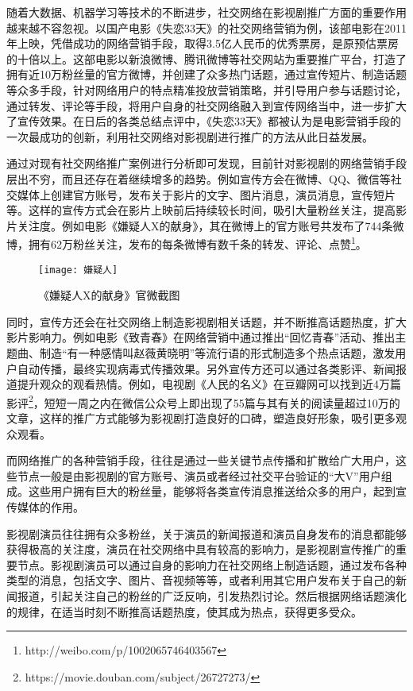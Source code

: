 随着大数据、机器学习等技术的不断进步，社交网络在影视剧推广方面的重要作用越来越不容忽视。以国产电影《失恋33天》的社交网络营销为例，该部电影在2011年上映，凭借成功的网络营销手段，取得3.5亿人民币的优秀票房，是原预估票房的十倍以上\cite{熊莉2012失恋}。这部电影以新浪微博、腾讯微博等社交网站为重要推广平台，打造了拥有近10万粉丝量的官方微博，并创建了众多热门话题，通过宣传短片、制造话题等众多手段，针对网络用户的特点精准投放营销策略，并引导用户参与话题讨论，通过转发、评论等手段，将用户自身的社交网络融入到宣传网络当中，进一步扩大了宣传效果。在日后的各类总结点评中，《失恋33天》都被认为是电影营销手段的一次最成功的创新，利用社交网络对影视剧进行推广的方法从此日益发展。

通过对现有社交网络推广案例进行分析即可发现，目前针对影视剧的网络营销手段层出不穷，而且还存在着继续增多的趋势。例如宣传方会在微博、QQ、微信等社交媒体上创建官方账号，发布关于影片的文字、图片消息，演员消息，宣传短片等。这样的宣传方式会在影片上映前后持续较长时间，吸引大量粉丝关注，提高影片关注度。例如电影《嫌疑人X的献身》，其在微博上的官方账号共发布了744条微博，拥有62万粉丝关注，发布的每条微博有数千条的转发、评论、点赞\footnote{http://weibo.com/p/1002065746403567}。

\begin{figure}[h] 
  \centering
  \texttt{[image: 嫌疑人]}
  \caption{《嫌疑人X的献身》官微截图}
\end{figure}

同时，宣传方还会在社交网络上制造影视剧相关话题，并不断推高话题热度，扩大影片影响力。例如电影《致青春》在网络营销中通过推出“回忆青春”活动、推出主题曲、制造“有一种感情叫赵薇黄晓明”等流行语的形式制造多个热点话题，激发用户自动传播，最终实现病毒式传播效果。另外宣传方还可以通过各类影评、新闻报道提升观众的观看热情。例如，电视剧《人民的名义》在豆瓣网可以找到近4万篇影评\footnote{https://movie.douban.com/subject/26727273/}，短短一周之内在微信公众号上即出现了55篇与其有关的阅读量超过10万的文章，这样的推广方式能够为影视剧打造良好的口碑，塑造良好形象，吸引更多观众观看。

而网络推广的各种营销手段，往往是通过一些关键节点传播和扩散给广大用户，这些节点一般是由影视剧的官方账号、演员或者经过社交平台验证的“大V”用户组成。这些用户拥有巨大的粉丝量，能够将各类宣传消息推送给众多的用户，起到宣传媒体的作用\cite{kwak2010twitter}。

影视剧演员往往拥有众多粉丝，关于演员的新闻报道和演员自身发布的消息都能够获得极高的关注度，演员在社交网络中具有较高的影响力\cite{shafiq2013identifying}，是影视剧宣传推广的重要节点。影视剧演员可以通过自身的影响力在社交网络上制造话题，通过发布各种类型的消息，包括文字、图片、音视频等等，或者利用其它用户发布关于自己的新闻报道，引起关注自己的粉丝的广泛反响，引发热烈讨论。然后根据网络话题演化的规律\cite{he2009detecting}，在适当时刻不断推高话题热度，使其成为热点，获得更多受众。

